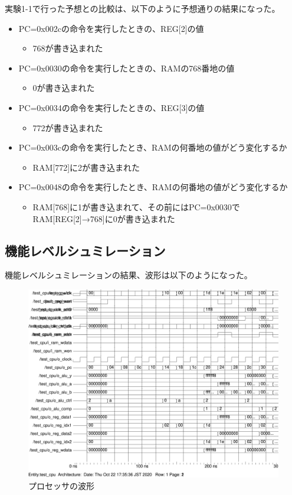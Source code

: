 実験1-1で行った予想との比較は、以下のように予想通りの結果になった。
\begin{itemize}
  \item PC=0x002cの命令を実行したときの、REG[2]の値
  \begin{itemize}
    \item 768が書き込まれた
  \end{itemize}
  \item PC=0x0030の命令を実行したときの、RAMの768番地の値
  \begin{itemize}
    \item 0が書き込まれた
  \end{itemize}
  \item PC=0x0034の命令を実行したときの、REG[3]の値
  \begin{itemize}
    \item 772が書き込まれた
  \end{itemize}
  \item PC=0x003cの命令を実行したとき、RAMの何番地の値がどう変化するか
  \begin{itemize}
    \item RAM[772]に2が書き込まれた
  \end{itemize}
  \item PC=0x0048の命令を実行したとき、RAMの何番地の値がどう変化するか
  \begin{itemize}
    \item RAM[768]に1が書き込まれて、その前にはPC=0x0030でRAM[REG[2]→768]に0が書き込まれた
  \end{itemize}
\end{itemize}

\subsection{機能レベルシュミレーション}
機能レベルシュミレーションの結果、波形は以下のようになった。
\begin{figure}[H]
  \centering
  \includegraphics[width=\linewidth]{./src/01/testCPUwave.png}
  \caption{プロセッサの波形}
  \label{プロセッサの波形1-1}
\end{figure}

